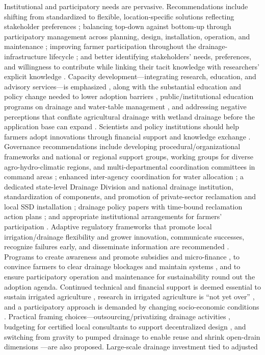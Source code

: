 \documentclass[11pt]{article}
\begin{document}
Institutional and participatory needs are pervasive. Recommendations include shifting from standardized to flexible, location-specific solutions reflecting stakeholder preferences \parencite{Ritzema2011,Ritzema2016,Ritzema2023}; balancing top-down against bottom-up through participatory management across planning, design, installation, operation, and maintenance \parencite{Ritzema2016}; improving farmer participation throughout the drainage-infrastructure lifecycle \parencite{Ritzema2023}; and better identifying stakeholders' needs, preferences, and willingness to contribute while linking their tacit knowledge with researchers' explicit knowledge \parencite{Ritzema2011}. Capacity development---integrating research, education, and advisory services---is emphasized \parencite{Ritzema2016}, along with the substantial education and policy change needed to lower adoption barriers \parencite{Castellano2019}, public/institutional education programs on drainage and water-table management \parencite{SHIRMOHAMMADI1995}, and addressing negative perceptions that conflate agricultural drainage with wetland drainage before the application base can expand \parencite{THOMAS1995}. Scientists and policy institutions should help farmers adopt innovations through financial support and knowledge exchange \parencite{Kesicka2023b}. Governance recommendations include developing procedural/organizational frameworks and national or regional support groups, working groups for diverse agro-hydro-climatic regions, and multi-departmental coordination committees in command areas \parencite{Singh2019c}; enhanced inter-agency coordination for water allocation \parencite{Qureshi2008}; a dedicated state-level Drainage Division and national drainage institution, standardization of components, and promotion of private-sector reclamation and local SSD installation \parencite{Gopalakrishnan2007}; drainage policy papers with time-bound reclamation action plans \parencite{Ritzema2008b,Valipour2014}; and appropriate institutional arrangements for farmers' participation \parencite{Ritzema2008b}. Adaptive regulatory frameworks that promote local irrigation/drainage flexibility and grower innovation, communicate successes, recognize failures early, and disseminate information are recommended \parencite{Quinn2009}. Programs to create awareness and promote subsidies and micro-finance \parencite{Satyanarayana2007}, to convince farmers to clear drainage blockages and maintain systems \parencite{Manjunatha2004}, and to ensure participatory operation and maintenance for sustainability \parencite{Gopalakrishnan2007} round out the adoption agenda. Continued technical and financial support is deemed essential to sustain irrigated agriculture \parencite{Qureshi2008}, research in irrigated agriculture is ``not yet over'' \parencite{Ritzema2007}, and a participatory approach is demanded by changing socio-economic conditions \parencite{Ritzema2007}. Practical framing choices---outsourcing/privatizing drainage activities \parencite{AbdelDayem2007}, budgeting for certified local consultants to support decentralized design \parencite{Ritzema2023}, and switching from gravity to pumped drainage to enable reuse and shrink open-drain dimensions \parencite{Ritzema2023}---are also proposed. Large-scale drainage investment tied to adjusted 
\end{document}
